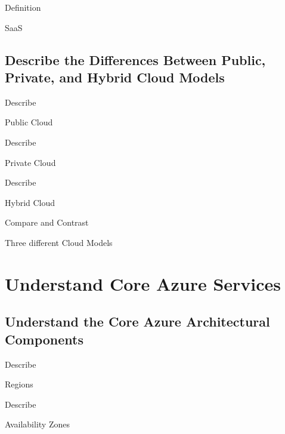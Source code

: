 \documentclass{scrartcl}
\newenvironment{flashcard}[2][]{%
    #1
    \vfill
    \centerline{\Large{#2}}
    \vfill
    \newpage
}
{\newpage}
\newcommand{\sectioncard}[1]{
    \vspace*{\stretch{1}}
    \section{#1}
    \vspace*{\stretch{1}}
    \pagebreak
}
\newcommand{\subsectioncard}[1]{
    \vspace*{\stretch{1}}
    \subsection{#1}
    \vspace*{\stretch{1}}
    \pagebreak
}
\begin{document}
    \begin{flashcard}[Definition]{SaaS}

    \end{flashcard}

    \subsectioncard{Describe the Differences Between Public, Private, and Hybrid Cloud Models}

    \begin{flashcard}[Describe]{Public Cloud}

    \end{flashcard}

    \begin{flashcard}[Describe]{Private Cloud}

    \end{flashcard}

    \begin{flashcard}[Describe]{Hybrid Cloud}

    \end{flashcard}

    \begin{flashcard}[Compare and Contrast]{Three different Cloud Models}

    \end{flashcard}

    \sectioncard{Understand Core Azure Services}

    \subsectioncard{Understand the Core Azure Architectural Components}

    \begin{flashcard}[Describe]{Regions}

    \end{flashcard}

    \begin{flashcard}[Describe]{Availability Zones}

    \end{flashcard}
\end{document}
